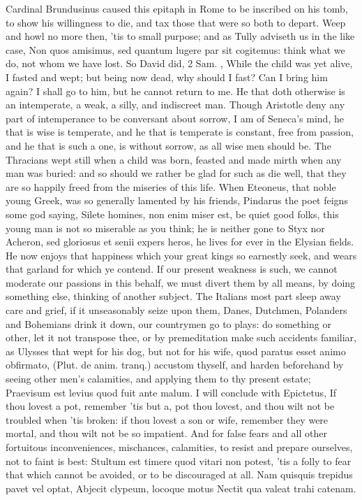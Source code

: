 {Cardinal Brundusinus caused this epitaph in Rome to be inscribed
on his tomb, to show his willingness to die, and tax those that were so
both to depart. Weep and howl no more then, 'tis to small purpose; and
as Tully adviseth us in the like case, Non quos amisimus, sed quantum
lugere par sit cogitemus: think what we do, not whom we have lost. So
David did, 2 Sam. , While the child was yet alive, I fasted and
wept; but being now dead, why should I fast? Can I bring him again? I
shall go to him, but he cannot return to me. He that doth otherwise is
an intemperate, a weak, a silly, and indiscreet man. Though Aristotle
deny any part of intemperance to be conversant about sorrow, I am of
Seneca's mind, he that is wise is temperate, and he that is
temperate is constant, free from passion, and he that is such a one, is
without sorrow, as all wise men should be. The Thracians wept
still when a child was born, feasted and made mirth when any man was
buried: and so should we rather be glad for such as die well, that they
are so happily freed from the miseries of this life. When Eteoneus,
that noble young Greek, was so generally lamented by his friends,
Pindarus the poet feigns some god saying, Silete homines, non enim
miser est, \etc{} be quiet good folks, this young man is not so miserable
as you think; he is neither gone to Styx nor Acheron, sed gloriosus et
senii expers heros, he lives for ever in the Elysian fields. He now
enjoys that happiness which your great kings so earnestly seek, and
wears that garland for which ye contend. If our present weakness is
such, we cannot moderate our passions in this behalf, we must divert
them by all means, by doing something else, thinking of another
subject. The Italians most part sleep away care and grief, if it
unseasonably seize upon them, Danes, Dutchmen, Polanders and Bohemians
drink it down, our countrymen go to plays: do something or other, let
it not transpose thee, or by  premeditation make such accidents
familiar, as Ulysses that wept for his dog, but not for his wife, quod
paratus esset animo obfirmato, (Plut. de anim. tranq.) accustom
thyself, and harden beforehand by seeing other men's calamities, and
applying them to thy present estate; Praevisum est levius quod fuit
ante malum. I will conclude with Epictetus, If thou lovest a pot,
remember 'tis but a, pot thou lovest, and thou wilt not be troubled
when 'tis broken: if thou lovest a son or wife, remember they were
mortal, and thou wilt not be so impatient. And for false fears and all
other fortuitous inconveniences, mischances, calamities, to resist and
prepare ourselves, not to faint is best: Stultum est timere quod
vitari non potest, 'tis a folly to fear that which cannot be avoided,
or to be discouraged at all.
Nam quisquis trepidus pavet vel optat,
Abjecit clypeum, locoque motus
Nectit qua valeat trahi catenam.

}
